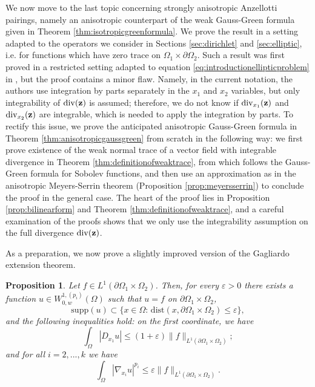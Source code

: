 \documentclass[reqno,12pt]{amsart}
\def\z{{\bf z}}
\newtheorem{proposition}[theorem]{Proposition}
\numberwithin{equation}{section}
\begin{document}
We now move to the last topic concerning strongly anisotropic Anzellotti pairings, namely an anisotropic counterpart of the weak Gauss-Green formula given in Theorem \ref{thm:isotropicgreenformula}. We prove the result in a setting adapted to the operators we consider in Sections \ref{sec:dirichlet} and \ref{sec:elliptic}, i.e. for functions which have zero trace on $\Omega_1 \times \partial\Omega_2$. Such a result was first proved in a restricted setting adapted to equation \eqref{eq:introductionellipticproblem} in \cite[Theorem 2.7]{MRST}, but the proof contains a minor flaw. Namely, in the current notation, the authors use integration by parts separately in the $x_1$ and $x_2$ variables, but only integrability of $\mathrm{div}(\z)$ is assumed; therefore, we do not know if $\mathrm{div}_{x_1}(\z)$ and $\mathrm{div}_{x_2}(\z)$ are integrable, which is needed to apply the integration by parts. To rectify this issue, we prove the anticipated anisotropic Gauss-Green formula in Theorem \ref{thm:anisotropicgaussgreen} from scratch in the following way: we first prove existence of the weak normal trace of a vector field with integrable divergence in Theorem \ref{thm:definitionofweaktrace}, from which follows the Gauss-Green formula for Sobolev functions, and then use an approximation as in the anisotropic Meyers-Serrin theorem (Proposition \ref{prop:meyersserrin})  to conclude the proof in the general case. The heart of the proof lies in Proposition \ref{prop:bilinearform} and Theorem \ref{thm:definitionofweaktrace}, and a careful examination of the proofs shows that we only use the integrability assumption on the full divergence $\mathrm{div}(\z)$.

As a preparation, we now prove a slightly improved version of the Gagliardo extension theorem.

\begin{proposition}\label{prop:gagliardo}
Let $f \in L^1(\partial\Omega_1 \times \Omega_2)$. Then, for every $\varepsilon > 0$ there exists a function $u \in W_{0,w}^{1,(p_i)}(\Omega)$ such that $u = f$ on $\partial\Omega_1 \times \Omega_2$,
$$\mathrm{supp}(u) \subset \{ x \in \Omega: \, \mathrm{dist}(x, \partial\Omega_1 \times \Omega_2) \leq \varepsilon \},$$
and the following inequalities hold: on the first coordinate, we have
\begin{equation}\label{eq:extensionestimatepart1}
\int_\Omega |D_{x_1} u| \leq (1 + \varepsilon) \| f \|_{L^1(\partial\Omega_1 \times \Omega_2)};
\end{equation}
and for all $i = 2, ..., k$ we have
\begin{equation}\label{eq:extensionestimatepart2}
\int_\Omega |\nabla_{x_i} u|^{p_i} \leq \varepsilon \| f \|_{L^1(\partial\Omega_1 \times \Omega_2)}.
\end{equation}

\end{proposition}
\end{document}
